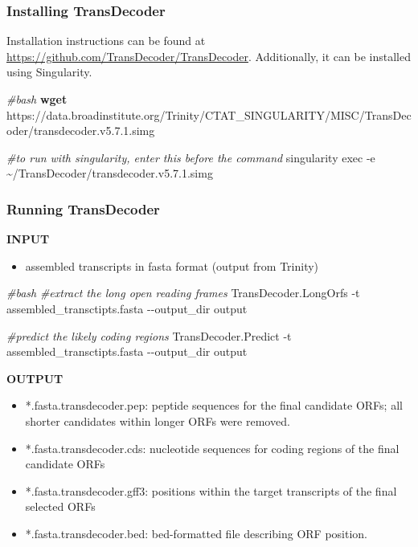 \documentclass[
  12pt,
]{article}
\newenvironment{Shaded}{\begin{snugshade}}{\end{snugshade}}
\newcommand{\AttributeTok}[1]{\textcolor[rgb]{0.13,0.29,0.53}{#1}}
\newcommand{\CommentTok}[1]{\textcolor[rgb]{0.56,0.35,0.01}{\textit{#1}}}
\newcommand{\ExtensionTok}[1]{#1}
\newcommand{\FunctionTok}[1]{\textcolor[rgb]{0.13,0.29,0.53}{\textbf{#1}}}
\newcommand{\NormalTok}[1]{#1}
\providecommand{\tightlist}{%
  \setlength{\itemsep}{0pt}\setlength{\parskip}{0pt}}
\begin{document}
\hypertarget{installing-transdecoder}{%
\subsubsection{Installing TransDecoder}\label{installing-transdecoder}}

Installation instructions can be found at \url{https://github.com/TransDecoder/TransDecoder}. Additionally, it can be installed using Singularity.

\begin{Shaded}
\begin{Highlighting}[]
\CommentTok{\#bash}
\FunctionTok{wget}\NormalTok{ https://data.broadinstitute.org/Trinity/CTAT\_SINGULARITY/MISC/TransDecoder/transdecoder.v5.7.1.simg}

\CommentTok{\#to run with singularity, enter this before the command}
\ExtensionTok{singularity}\NormalTok{ exec }\AttributeTok{{-}e}\NormalTok{ \textasciitilde{}/TransDecoder/transdecoder.v5.7.1.simg}
\end{Highlighting}
\end{Shaded}

\hypertarget{running-transdecoder}{%
\subsubsection{Running TransDecoder}\label{running-transdecoder}}

\textbf{INPUT}

\begin{itemize}
\tightlist
\item
  assembled transcripts in fasta format (output from Trinity)
\end{itemize}

\begin{Shaded}
\begin{Highlighting}[]
\CommentTok{\#bash}
\CommentTok{\#extract the long open reading frames}
\ExtensionTok{TransDecoder.LongOrfs} \AttributeTok{{-}t}\NormalTok{ assembled\_transctipts.fasta }\AttributeTok{{-}{-}output\_dir}\NormalTok{ output}

\CommentTok{\#predict the likely coding regions}
\ExtensionTok{TransDecoder.Predict} \AttributeTok{{-}t}\NormalTok{ assembled\_transctipts.fasta }\AttributeTok{{-}{-}output\_dir}\NormalTok{ output }
\end{Highlighting}
\end{Shaded}

\textbf{OUTPUT}

\begin{itemize}
\tightlist
\item
  *.fasta.transdecoder.pep: peptide sequences for the final candidate ORFs; all shorter candidates within longer ORFs were removed.
\item
  *.fasta.transdecoder.cds: nucleotide sequences for coding regions of the final candidate ORFs
\item
  *.fasta.transdecoder.gff3: positions within the target transcripts of the final selected ORFs
\item
  *.fasta.transdecoder.bed: bed-formatted file describing ORF position.
\end{itemize}
\end{document}
